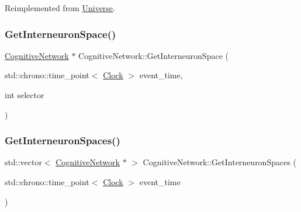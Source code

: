 Reimplemented from \mbox{\hyperlink{classUniverse_ab0404e774ee0ed66b597ff5b8e989446}{Universe}}.

\mbox{\label{classCognitiveNetwork_a0119d61e86ea6b84ad7f69f88d59d008}} 
\subsubsection{\texorpdfstring{Get\+Interneuron\+Space()}{GetInterneuronSpace()}}
{\footnotesize\ttfamily \mbox{\hyperlink{classCognitiveNetwork}{Cognitive\+Network}} $\ast$ Cognitive\+Network\+::\+Get\+Interneuron\+Space (\begin{DoxyParamCaption}\item[{std\+::chrono\+::time\+\_\+point$<$ \mbox{\hyperlink{universe_8h_a0ef8d951d1ca5ab3cfaf7ab4c7a6fd80}{Clock}} $>$}]{event\+\_\+time,  }\item[{int}]{selector }\end{DoxyParamCaption})}

\mbox{\label{classCognitiveNetwork_a4daf966882d527b784bd359794ad39ca}} 
\subsubsection{\texorpdfstring{Get\+Interneuron\+Spaces()}{GetInterneuronSpaces()}}
{\footnotesize\ttfamily std\+::vector$<$ \mbox{\hyperlink{classCognitiveNetwork}{Cognitive\+Network}} $\ast$ $>$ Cognitive\+Network\+::\+Get\+Interneuron\+Spaces (\begin{DoxyParamCaption}\item[{std\+::chrono\+::time\+\_\+point$<$ \mbox{\hyperlink{universe_8h_a0ef8d951d1ca5ab3cfaf7ab4c7a6fd80}{Clock}} $>$}]{event\+\_\+time }\end{DoxyParamCaption})}

\mbox{\label{classCognitiveNetwork_ac12f0af92d878d45dca7303dc065c383}} 
